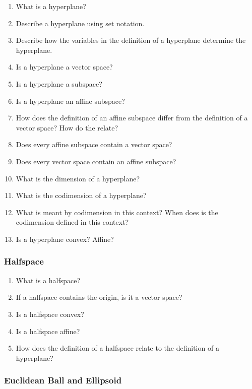 \documentclass[]{article}
\begin{document}
\begin{enumerate}[resume*]
\item What is a hyperplane? 
\item Describe a hyperplane using set notation. 
\item Describe how the variables in the definition of a hyperplane determine the hyperplane. 
\item Is a hyperplane a vector space? 
\item Is a hyperplane a subspace? 
\item Is a hyperplane an affine subspace? 
\item How does the definition of an affine subspace differ from the definition of a vector space? How do the relate? 
\item Does every affine subspace contain a vector space? 
\item Does every vector space contain an affine subspace? 
\item What is the dimension of a hyperplane? 
\item What is the codimension of a hyperplane? 
\item What is meant by codimension in this context? When does is the codimension defined in this context? 
\item Is a hyperplane convex? Affine? 
\end{enumerate}

\subsubsection*{Halfspace}

\begin{enumerate}[resume*]
\item What is a halfspace?
\item If a halfspace contains the origin, is it a vector space?
\item Is a halfspace convex?
\item Is a halfspace affine?
\item How does the definition of a halfspace relate to the definition of a hyperplane?
\end{enumerate}

\subsubsection*{Euclidean Ball and Ellipsoid}
\end{document}
